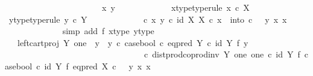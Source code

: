 \begin{isabellebody}
\ \ \ \ \ \ \ \ \isamarkupfalse%
\ {\isacharminus}{\kern0pt}\ \isanewline
\ \ \ \ \ \ \ \ \ \ \isamarkupfalse%
\ x\ y\ \isanewline
\ \ \ \ \ \ \ \ \ \ \isamarkupfalse%
\ x{\isacharunderscore}{\kern0pt}type{\isacharbrackleft}{\kern0pt}type{\isacharunderscore}{\kern0pt}rule{\isacharbrackright}{\kern0pt}{\isacharcolon}{\kern0pt}\ {\isachardoublequoteopen}x\ {\isasymin}\isactrlsub c\ X{\isachardoublequoteclose}\isanewline
\ \ \ \ \ \ \ \ \ \ \isamarkupfalse%
\ y{\isacharunderscore}{\kern0pt}type{\isacharbrackleft}{\kern0pt}type{\isacharunderscore}{\kern0pt}rule{\isacharbrackright}{\kern0pt}{\isacharcolon}{\kern0pt}\ {\isachardoublequoteopen}y\ {\isasymin}\isactrlsub c\ Y{\isachardoublequoteclose}\isanewline
\ \ \ \ \ \ \ \ \ \ \isamarkupfalse%
\ {\isachardoublequoteopen}{\isacharparenleft}{\kern0pt}{\isasymTheta}\ {\isasymcirc}\isactrlsub c\ {\isasymlangle}x{\isacharcomma}{\kern0pt}\ y{\isasymrangle}{\isacharparenright}{\kern0pt}\isactrlsup {\isasymflat}\ {\isasymcirc}\isactrlsub c\ {\isasymlangle}id\ X{\isacharcomma}{\kern0pt}\ {\isasymbeta}\isactrlbsub X\isactrlesub {\isasymrangle}\ {\isasymcirc}\isactrlsub c\ x\ {\isacharequal}{\kern0pt}\ into\ {\isasymcirc}\isactrlsub c\ \ \ {\isasymlangle}y{\isacharcomma}{\kern0pt}\ {\isasymlangle}x{\isacharcomma}{\kern0pt}\ x{\isasymrangle}{\isasymrangle}{\isachardoublequoteclose}\isanewline
\ \ \ \ \ \ \ \ \ \ \ \ \isamarkupfalse%
\ {\isacharparenleft}{\kern0pt}simp\ add{\isacharcolon}{\kern0pt}\ f{}\ x{\isacharunderscore}{\kern0pt}type\ y{\isacharunderscore}{\kern0pt}type{\isacharparenright}{\kern0pt}\isanewline
\ \ \ \ \ \ \ \ \ \ \isamarkupfalse%
\ \isamarkupfalse%
\ {\isachardoublequoteopen}{\isachardot}{\kern0pt}{\isachardot}{\kern0pt}{\isachardot}{\kern0pt}\ {\isacharequal}{\kern0pt}\ {\isacharparenleft}{\kern0pt}left{\isacharunderscore}{\kern0pt}cart{\isacharunderscore}{\kern0pt}proj\ Y\ one\ {\isasymamalg}\ {\isacharparenleft}{\kern0pt}{\isacharparenleft}{\kern0pt}y{}\ {\isasymamalg}\ y{}{\isacharparenright}{\kern0pt}\ {\isasymcirc}\isactrlsub c\ case{\isacharunderscore}{\kern0pt}bool\ {\isasymcirc}\isactrlsub c\ eq{\isacharunderscore}{\kern0pt}pred\ Y\ {\isasymcirc}\isactrlsub c\ {\isacharparenleft}{\kern0pt}id\ Y\ {\isasymtimes}\isactrlsub f\ y{}{\isacharparenright}{\kern0pt}{\isacharparenright}{\kern0pt}{\isacharparenright}{\kern0pt}\isanewline
\ \ \ \ \ \ \ \ \ \ \ \ \ \ \ \ \ \ \ \ \ \ \ \ \ \ \ \ \ \ \ \ \ {\isasymcirc}\isactrlsub c\ dist{\isacharunderscore}{\kern0pt}prod{\isacharunderscore}{\kern0pt}coprod{\isacharunderscore}{\kern0pt}inv\ Y\ one\ one\ {\isasymcirc}\isactrlsub c\ {\isacharparenleft}{\kern0pt}id\ Y\ {\isasymtimes}\isactrlsub f\ case{\isacharunderscore}{\kern0pt}bool{\isacharparenright}{\kern0pt}\ {\isasymcirc}\isactrlsub c\ {\isacharparenleft}{\kern0pt}id\ Y\ {\isasymtimes}\isactrlsub f\ eq{\isacharunderscore}{\kern0pt}pred\ X{\isacharparenright}{\kern0pt}\ {\isasymcirc}\isactrlsub c\ \ \ {\isasymlangle}y{\isacharcomma}{\kern0pt}\ {\isasymlangle}x{\isacharcomma}{\kern0pt}\ x{\isasymrangle}{\isasymrangle}{\isachardoublequoteclose}\isanewline

\end{isabellebody}
